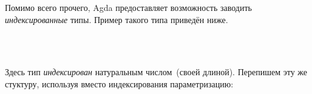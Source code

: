 
Помимо всего прочего, Agda предоставляет возможность заводить
\emph{индексированные} типы. Пример такого типа приведён ниже.

\begin{code}%
\>  \AgdaSymbol{(} \AgdaSymbol{:} \AgdaSymbol{)} \AgdaSymbol{:}    \<%
\\
\>[0]\<[2]%
\>[2]\AgdaInductiveConstructor{[]} \<[6]%
\>[6]\AgdaSymbol{:}   \<%
\\
\>[0]\<[2]%
\>[2] \AgdaSymbol{:}  \AgdaSymbol{\{}\AgdaSymbol{\}}          \AgdaSymbol{(} \AgdaSymbol{)}\<%
\end{code}

Здесь тип  \emph{индексирован} натуральным
числом~(своей длиной). Перепишем эту же стуктуру, используя
вместо индексирования параметризацию:

